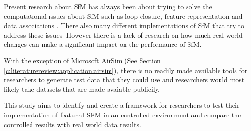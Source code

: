 Present research about SfM has always been about trying to solve the computational issues about SfM such as loop closure, feature representation and data associations \cite{durrant2006simultaneous}. There also many different implementations of SfM that try to address these issues. However there is a lack of research on how much real world changes can make a significant impact on the performance of SfM.

With the exception of Microsoft AirSim (See Section \ref{c:literaturereview:application:airsim}), there is no readily made available tools for researchers to generate test data that they could use and researchers would most likely take datasets that are made avaiable publicily. 

This study aims to identify and create a framework for researchers to test their implementation of featured-SFM in an controlled environment and compare the controlled results with real world data results. 